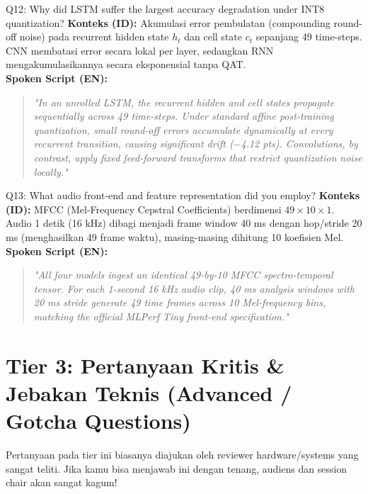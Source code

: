 \documentclass[11pt,a4paper]{article}
\begin{document}
\begin{mediumbox}{Q12: Why did LSTM suffer the largest accuracy degradation under INT8 quantization?}
\textbf{Konteks (ID):} Akumulasi error pembulatan (compounding round-off noise) pada recurrent hidden state $h_t$ dan cell state $c_t$ sepanjang 49 time-steps. CNN membatasi error secara lokal per layer, sedangkan RNN mengakumulasikannya secara eksponensial tanpa QAT.\\
\textbf{Spoken Script (EN):}
\begin{quote}
\small
\textit{"In an unrolled LSTM, the recurrent hidden and cell states propagate sequentially across 49 time-steps. Under standard affine post-training quantization, small round-off errors accumulate dynamically at every recurrent transition, causing significant drift ($-$4.12 pts). Convolutions, by contrast, apply fixed feed-forward transforms that restrict quantization noise locally."}
\end{quote}
\end{mediumbox}

\begin{mediumbox}{Q13: What audio front-end and feature representation did you employ?}
\textbf{Konteks (ID):} MFCC (Mel-Frequency Cepstral Coefficients) berdimensi $49 \times 10 \times 1$. Audio 1 detik (16 kHz) dibagi menjadi frame window 40 ms dengan hop/stride 20 ms (menghasilkan 49 frame waktu), masing-masing dihitung 10 koefisien Mel.\\
\textbf{Spoken Script (EN):}
\begin{quote}
\small
\textit{"All four models ingest an identical 49-by-10 MFCC spectro-temporal tensor. For each 1-second 16 kHz audio clip, 40 ms analysis windows with 20 ms stride generate 49 time frames across 10 Mel-frequency bins, matching the official MLPerf Tiny front-end specification."}
\end{quote}
\end{mediumbox}

\newpage
\section*{\textcolor{TierRedBorder}{\Large Tier 3: Pertanyaan Kritis \& Jebakan Teknis (Advanced / Gotcha Questions)}}
Pertanyaan pada tier ini biasanya diajukan oleh reviewer hardware/systems yang sangat teliti. Jika kamu bisa menjawab ini dengan tenang, audiens dan session chair akan sangat kagum!
\end{document}
